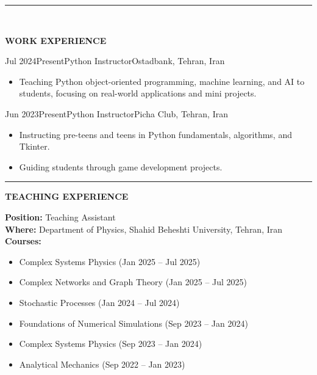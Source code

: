 \documentclass[11pt, b4paper]{cv}
\begin{document}
\pagebreak
\rule{\textwidth}{1pt}\\
\vspace{-0.15in}

\textbf{WORK EXPERIENCE}

\begin{work}{Jul 2024}{Present}{Python Instructor}{Ostadbank, Tehran, Iran}
	\begin{itemize}
		\item Teaching Python object-oriented programming, machine learning, and AI to students, focusing on real-world applications and mini projects.
	\end{itemize}
\end{work}

\vspace{-0.1in}

\begin{work}{Jun 2023}{Present}{Python Instructor}{Picha Club, Tehran, Iran}
	\begin{itemize}
		\item Instructing pre-teens and teens in Python fundamentals, algorithms, and Tkinter.
		\item Guiding students through game development projects.
	\end{itemize}
\end{work}

\vspace{-0.15in}
\rule{\textwidth}{1pt}
\vspace{-0.15in}

\textbf{TEACHING EXPERIENCE}

\textbf{Position:} Teaching Assistant\\
\textbf{Where:} \hspace{0.1in}Department of Physics, Shahid Beheshti University, Tehran, Iran\\
\textbf{Courses:}
\begin{multicols}{2}
	\begin{itemize}
		\item Complex Systems Physics (Jan 2025 – Jul 2025)
		\item Complex Networks and Graph Theory (Jan 2025 – Jul 2025)
		\item Stochastic Processes (Jan 2024 – Jul 2024)
		\item Foundations of Numerical Simulations (Sep 2023 – Jan 2024)
		\item Complex Systems Physics (Sep 2023 – Jan 2024)
		\item Analytical Mechanics (Sep 2022 – Jan 2023)
	\end{itemize}    
\end{multicols}
\end{document}
